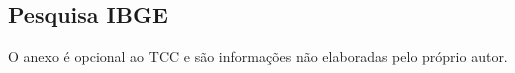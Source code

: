 \documentclass[
	12pt,				%
	openright,			%
	oneside,			%
	a4paper,			%
	chapter=TITLE,		%
	section=TITLE,		%
	english,			%
	french,				%
	spanish,			%
	brazil				%
	]{abntex2}
\begin{document}
\begin{anexosenv}

\chapter{Pesquisa IBGE}
O anexo é opcional ao TCC e são informações não elaboradas pelo próprio autor.

\end{anexosenv}

\label{nropaginas}


\printindex
\end{document}
